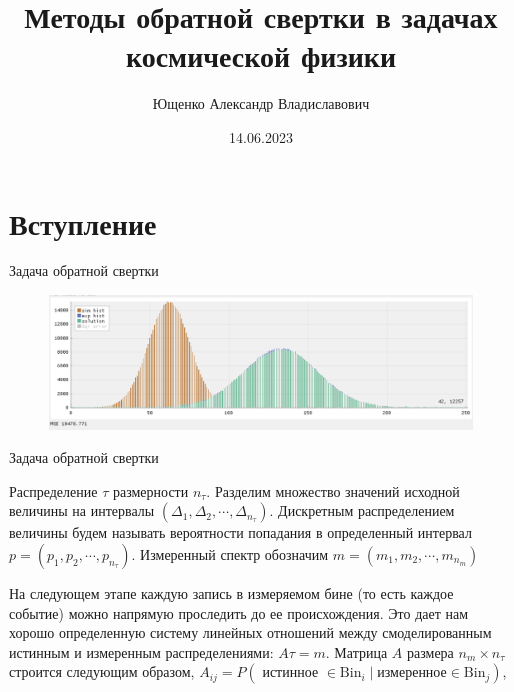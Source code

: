 \documentclass[fullscreen=true,russian,compress,%
	hyperref={unicode,bookmarks=false}]{presentation}
\begin{document}

\title[Методы обратной свертки в задачах космической физики]{Методы обратной свертки в задачах \\ космической физики}
\author{Ющенко Александр Владиславович}
\date{14.06.2023}

\begin{frame}
\titlepage
\end{frame}


\section{Вступление}


\begin{frame}{Задача обратной свертки}
   \begin{figure}[!ht]
      \includegraphics[width=\linewidth]{images/example_regulazation.png}
   \end{figure}
\end{frame}

\begin{frame}{Задача обратной свертки}
\begin{block}{}
   Распределение $\tau$ размерности $n_{\tau}$. Разделим множество значений исходной величины на интервалы 
   $(\Delta_{1}, \Delta_{2}, \cdots ,\Delta_{n_{\tau}})$. Дискретным распределением величины будем называть вероятности попадания 
   в определенный интервал $p = (p_{1}, p_{2}, \cdots, p_{n_{\tau}})$. Измеренный спектр обозначим $m = (m_{1}, m_{2}, \cdots, m_{n_{m}})$
\end{block}
\begin{block}{}
   На следующем этапе каждую запись в измеряемом бине (то есть каждое событие) можно напрямую проследить до ее происхождения. 
   Это дает нам хорошо определенную систему линейных отношений между смоделированным истинным и измеренным распределениями: 
   $A\tau = m$. Матрица $A$ размера $n_{m} \times n_{\tau}$ строится следующим образом, 
   $A_{ij} = P( \text{ истинное } \in \text{Bin}_{i} \mid \text{измеренное} \in \text{Bin}_{j} )$, 
\end{block}
\end{frame}
\end{document}
